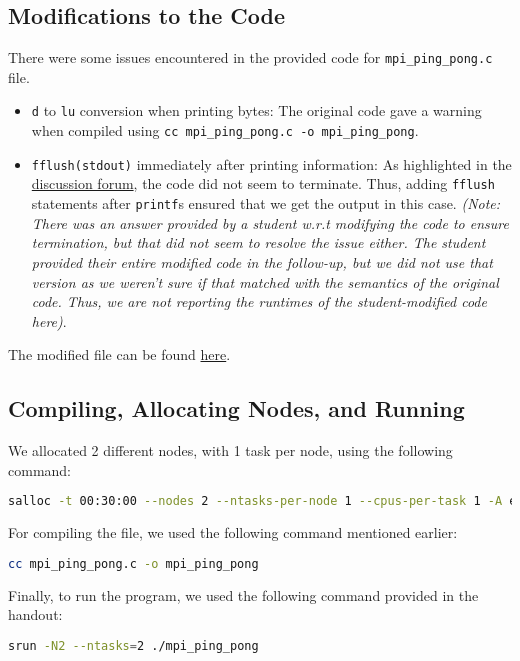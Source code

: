 \documentclass[a4paper,10pt]{article}
\begin{document}
\subsection{Modifications to the Code}
There were some issues encountered in the provided code for \verb|mpi_ping_pong.c| file. 
\begin{itemize}
\item \verb|d| to \verb|lu| conversion when printing bytes: The original code gave a warning when compiled using \verb|cc mpi_ping_pong.c -o mpi_ping_pong|. \\
\item \verb|fflush(stdout)| immediately after printing information: As highlighted in the \href{https://canvas.kth.se/courses/53216/discussion_topics/456480}{discussion forum}, the code did not seem to terminate. Thus, adding \verb|fflush| statements after \verb|printf|s ensured that we get the output in this case. \textit{(Note: There was an answer provided by a student w.r.t modifying the code to ensure termination, but that did not seem to resolve the issue either. The student provided their entire modified code in the follow-up, but we did not use that version as we weren't sure if that matched with the semantics of the original code. Thus, we are not reporting the runtimes of the student-modified code here)}. 
\end{itemize}
The modified file can be found \href{https://github.com/paulmyr/DD2356-MethodsHPC/blob/master/2_hpc_arch_perf_model/bonus/mpi_ping_pong.c}{here}.

\subsection{Compiling, Allocating Nodes, and Running}
We allocated 2 different nodes, with 1 task per node, using the following command: 
\begin{lstlisting}[language=bash,basicstyle=\tiny\ttfamily]
salloc -t 00:30:00 --nodes 2 --ntasks-per-node 1 --cpus-per-task 1 -A edu25.DD2356 -p shared 
\end{lstlisting}
For compiling the file, we used the following command mentioned earlier: 
\begin{lstlisting}[language=bash,basicstyle=\ttfamily]
cc mpi_ping_pong.c -o mpi_ping_pong
\end{lstlisting}
Finally, to run the program, we used the following command provided in the handout: 
\begin{lstlisting}[language=bash,basicstyle=\ttfamily]
srun -N2 --ntasks=2 ./mpi_ping_pong
\end{lstlisting}
\end{document}
